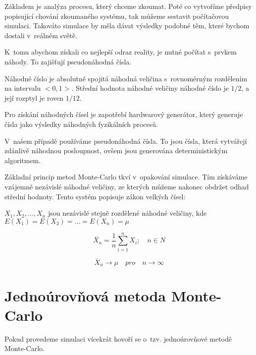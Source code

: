 \documentclass[FM, RP]{tulthesis}
\begin{document}




Základem je analýza procesu, který chceme zkoumat. Poté co vytvoříme předpisy popisující chování zkoumaného systému, tak můžeme sestavit počítačovou simulaci. Takováto simulace by měla dávat výsledky podobné těm, které bychom dostali v~reálném světě.

K~tomu abychom získali co nejlepší odraz reality, je nutné počítat s~prvkem náhody. To zajišťují pseudonáhodná čísla.

Náhodné číslo je absolutně spojitá náhodná veličina s~rovnoměrným rozdělením na intervalu $<0,1>$. Střední hodnota náhodné veličiny náhodné číslo je $1/2$, a její rozptyl je roven $1/12$. \cite{klvana}

Pro získání náhodných čísel je zapotřebí hardwarový generátor, který generuje čísla jako výsledky náhodných fyzikálních procesů. 

V~našem případě používáme pseudonáhodná čísla. To jsou čísla, která vytvářejí zdánlivě náhodnou posloupnost, ovšem jsou generována deterministickým algoritmem.

Základní princip metod Monte-Carlo tkví v~opakování simulace. Tím získáváme vzájemně nezávislé náhodné veličiny, ze kterých můžeme nakonec obdržet odhad střední hodnoty. Tento systém popisuje zákon velkých čísel:


$X_{1},X_{2}, ... ,X_{n}$ jsou nezávislé stejně rozdělené náhodné veličiny, kde $E(X_{1}) = E(X_{2}) = ... = E(X_{n}) = \mu$

$$\overline{X}_{n} = \frac{1}{n}{\sum_{i=1}^{n}X_{i}}; \quad n \in N$$

$$\overline{X}_{n} \rightarrow \mu \quad pro \quad n \rightarrow \infty$$


\section{Jednoúrovňová metoda Monte-Carlo}
Pokud provedeme simulaci vícekrát hovoří se o~tzv. jednoúrovňové metodě Monte-Carlo.
\end{document}
